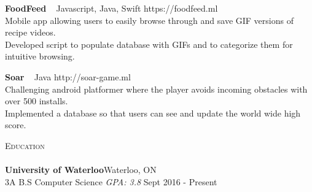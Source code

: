 \documentclass[a4paper]{article}
\newcommand{\lineunder} {
    \vspace*{-8pt} \\
    \hspace*{-18pt} \hrulefill \\
}
\newcommand{\header} [1] {
    {\hspace*{-18pt}\vspace*{6pt} \textsc{#1}}
    \vspace*{-6pt} \lineunder
}
\begin{document}
{\textbf{FoodFeed}} {\ \textbar{} Javascript, Java, Swift} \hfill https://foodfeed.ml\\
Mobile app allowing users to easily browse through and save GIF versions of recipe videos.\\
Developed script to populate database with GIFs and to categorize them for intuitive browsing. \\
\vspace*{2mm}

{\textbf{Soar}} {\ \textbar{} Java} \hfill http://soar-game.ml\\
Challenging android platformer where the player avoids incoming obstacles with over 500 installs.\\
Implemented a database so that users can see and update the world wide high score.\\
\vspace*{2mm}

\header{Education}
\textbf{University of Waterloo}\hfill Waterloo, ON\\
3A B.S Computer Science \textit{GPA: 3.8} \hfill Sept 2016 - Present\\


\vspace{2mm}

\ 
\end{document}
